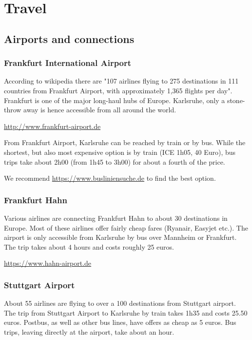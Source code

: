 \section{Travel}

\subsection{Airports and connections}

\subsubsection{Frankfurt International Airport}

According to wikipedia there are "107 airlines flying to 275 destinations in 111 countries from Frankfurt Airport, with approximately 1,365 flights per day". Frankfurt is one of the major long-haul hubs of Europe. Karlsruhe, only a stone-throw away is hence accessible from all around the world.

\url{http://www.frankfurt-airport.de}

From Frankfurt Airport, Karlsruhe can be reached by train or by bus. While the shortest, but also most expensive option is by train (ICE 1h05, 40 Euro), bus trips take about 2h00 (from 1h45 to 3h00) for about a fourth of the price.

We recommend \url{https://www.busliniensuche.de} to find the best option.

\subsubsection{Frankfurt Hahn}

Various airlines are connecting Frankfurt Hahn to about 30 destinations in Europe. Most of these airlines offer fairly cheap fares (Ryanair, Easyjet etc.). The airport is only accessible from Karlsruhe by bus over Mannheim or Frankfurt. The trip takes about 4 hours and costs roughly 25 euros.

\url{https://www.hahn-airport.de}

\subsubsection{Stuttgart Airport}

About 55 airlines are flying to over a 100 destinations from Stuttgart airport. The trip from Stuttgart Airport to Karlsruhe by train takes 1h35 and costs 25.50 euros. Postbus, as well as other bus lines, have offers as cheap as 5 euros. Bus trips, leaving directly at the airport, take about an hour. 

